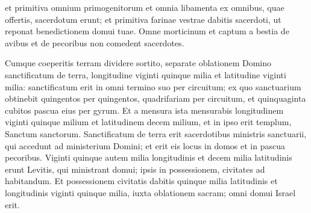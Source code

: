 \begin{biblechapter}
\begin{biblechapter}
\begin{biblechapter}
\begin{biblechapter}
\begin{biblechapter}
\begin{biblechapter}
\begin{biblechapter}
\begin{biblechapter}
\begin{biblechapter}
\begin{biblechapter}
\begin{biblechapter}
\begin{biblechapter}
\begin{biblechapter}
\begin{biblechapter}
\begin{biblechapter}
\begin{biblechapter}
\begin{biblechapter}
\begin{biblechapter}
\begin{biblechapter}
\begin{biblechapter}
\begin{biblechapter}
\begin{biblechapter}
\begin{biblechapter}
\begin{biblechapter}
\begin{biblechapter}
\begin{biblechapter}
\begin{biblechapter}
\begin{biblechapter}
\begin{biblechapter}
\begin{biblechapter}
\begin{biblechapter}
\begin{biblechapter}
\begin{biblechapter}
\begin{biblechapter}
\begin{biblechapter}
\begin{biblechapter}
\begin{biblechapter}
\begin{biblechapter}
\begin{biblechapter}
\begin{biblechapter}
\begin{biblechapter}
\begin{biblechapter}
\begin{biblechapter}
\begin{biblechapter}
\verse et primitiva omnium primogenitorum et omnia libamenta ex omnibus, quae offertis, sacerdotum erunt; et primitiva farinae vestrae dabitis sacerdoti, ut reponat benedictionem domui tuae. 
\verse Omne morticinum et captum a bestia de avibus et de pecoribus non comedent sacerdotes.
 
\begin{biblechapter}
\verse Cumque coeperitis terram dividere sortito, separate oblationem Domino sanctificatum de terra, longitudine viginti quinque milia et latitudine viginti milia: sanctificatum erit in omni termino suo per circuitum; 
\verse ex quo sanctuarium obtinebit quingentos per quingentos, quadrifariam per circuitum, et quinquaginta cubitos pascua eius per gyrum. 
\verse Et a mensura ista mensurabis longitudinem viginti quinque milium et latitudinem decem milium, et in ipso erit templum, Sanctum sanctorum. 
\verse Sanctificatum de terra erit sacerdotibus ministris sanctuarii, qui accedunt ad ministerium Domini; et erit eis locus in domos et in pascua pecoribus. 
\verse Viginti quinque autem milia longitudinis et decem milia latitudinis erunt Levitis, qui ministrant domui; ipsis in possessionem, civitates ad habitandum. 
\verse Et possessionem civitatis dabitis quinque milia latitudinis et longitudinis viginti quinque milia, iuxta oblationem sacram; omni domui Israel erit.

\end{biblechapter}
\end{biblechapter}
\end{biblechapter}
\end{biblechapter}
\end{biblechapter}
\end{biblechapter}
\end{biblechapter}
\end{biblechapter}
\end{biblechapter}
\end{biblechapter}
\end{biblechapter}
\end{biblechapter}
\end{biblechapter}
\end{biblechapter}
\end{biblechapter}
\end{biblechapter}
\end{biblechapter}
\end{biblechapter}
\end{biblechapter}
\end{biblechapter}
\end{biblechapter}
\end{biblechapter}
\end{biblechapter}
\end{biblechapter}
\end{biblechapter}
\end{biblechapter}
\end{biblechapter}
\end{biblechapter}
\end{biblechapter}
\end{biblechapter}
\end{biblechapter}
\end{biblechapter}
\end{biblechapter}
\end{biblechapter}
\end{biblechapter}
\end{biblechapter}
\end{biblechapter}
\end{biblechapter}
\end{biblechapter}
\end{biblechapter}
\end{biblechapter}
\end{biblechapter}
\end{biblechapter}
\end{biblechapter}
\end{biblechapter}
